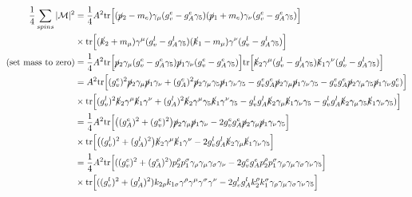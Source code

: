\documentclass[11pt]{article}
\begin{document}
\begin{align*}
\frac{1}{4} \sum_{spins} |\mathcal{M}|^2 &= \frac{1}{4} A^2 \text{tr}
\Big[ (\cancel{p}_2 -m_e)  
\gamma_{\mu} (g_v^e - g_A^e \gamma_5) (\cancel{p}_1 + m_e) 
\gamma_{\nu} (g_v^e - g_A^e \gamma_5)\Big]\\
& \times \text{tr} \Big[
(\cancel{k}_2 + m_{\mu}) \gamma^{\mu} (g_v^l - g_A^l \gamma_5) (\cancel{k}_1 - m_{\mu}) \gamma^{\nu} (g_v^l - g_A^l \gamma_5) 
\Big]\\
\text{(set mass to zero)}
&= \frac{1}{4} A^2 \text{tr}
\Big[ \cancel{p}_2 
\gamma_{\mu} (g_v^e - g_A^e \gamma_5) \cancel{p}_1 
\gamma_{\nu} (g_v^e - g_A^e \gamma_5)\Big]
\text{tr} \Big[
\cancel{k}_2 \gamma^{\mu} (g_v^l - g_A^l \gamma_5) \cancel{k}_1 \gamma^{\nu} (g_v^l - g_A^l \gamma_5) 
\Big]\\
&= A^2 \text{tr}
\Big[ (g_v^e)^2 \cancel{p}_2 
\gamma_{\mu} 
\cancel{p}_1 
\gamma_{\nu} 
+
(g_A^e)^2
\cancel{p}_2 
\gamma_{\mu} \gamma_5
 \cancel{p}_1 
\gamma_{\nu} \gamma_5
- g_v^e g_A^e 
\cancel{p}_2 
\gamma_{\mu} \cancel{p}_1 
\gamma_{\nu} \gamma_5
- g_v^e g_A^e \cancel{p}_2 
\gamma_{\mu} \gamma_5 \cancel{p}_1 
\gamma_{\nu} g_v^e)
\Big] \\
& \times
\text{tr} \Big[
(g_v^l)^2
\cancel{k}_2 \gamma^{\mu} 
 \cancel{k}_1 \gamma^{\nu} 
+(g_A^l)^2
\cancel{k}_2 \gamma^{\mu} \gamma_5
 \cancel{k}_1 \gamma^{\nu} \gamma_5 
- g_v^l g_A^l 
\cancel{k}_2 
\gamma_{\mu} \cancel{k}_1 
\gamma_{\nu} \gamma_5
- g_v^l g_A^l \cancel{k}_2 
\gamma_{\mu} \gamma_5 \cancel{k}_1 
\gamma_{\nu}\gamma_5)
\Big] \\
&= \frac{1}{4} A^2 \text{tr}
\Big[  
\big((g_A^e)^2 + (g_v^e)^2\big)
\cancel{p}_2 
\gamma_{\mu} 
 \cancel{p}_1 
\gamma_{\nu} 
- 2 g_v^e g_A^e 
\cancel{p}_2 
\gamma_{\mu} \cancel{p}_1 
\gamma_{\nu} \gamma_5 \Big]\\
& \times
\text{tr} \Big[
\big( (g_v^l)^2 +(g_A^l)^2 \big)
\cancel{k}_2 \gamma^{\mu} 
 \cancel{k}_1 \gamma^{\nu} 
- 2 g_v^l g_A^l 
\cancel{k}_2 
\gamma_{\mu} \cancel{k}_1 
\gamma_{\nu} \gamma_5
\Big] \\
&= \frac{1}{4} A^2 \text{tr}
\Big[
 ((g_v^e)^2 + (g_A^e)^2)p_2^{\rho} p_1^{\sigma} \gamma_{\rho} 
\gamma_{\mu} 
 \gamma_{\sigma}
\gamma_{\nu} 
- 2 g_v^e g_A^e 
p_2^{\rho}  p_1^{\sigma} \gamma_{\rho} \gamma_{\mu}\gamma_{\sigma} \gamma_{\nu} \gamma_5
\Big]\\
&\times \text{tr} \Big[
((g_v^l)^2 + (g_A^l)^2) k_{2 \rho} k_{1 \sigma} \gamma^{\rho} \gamma^{\mu} 
 \gamma^{\sigma} \gamma^{\nu}
 - 2 g_v^l g_A^l 
k_2^{ \rho} k_1^{ \sigma} \gamma_{\rho}
\gamma_{\mu}  \gamma_{\sigma}
\gamma_{\nu} \gamma_5 
\Big]\\
\end{align*}
\end{document}
